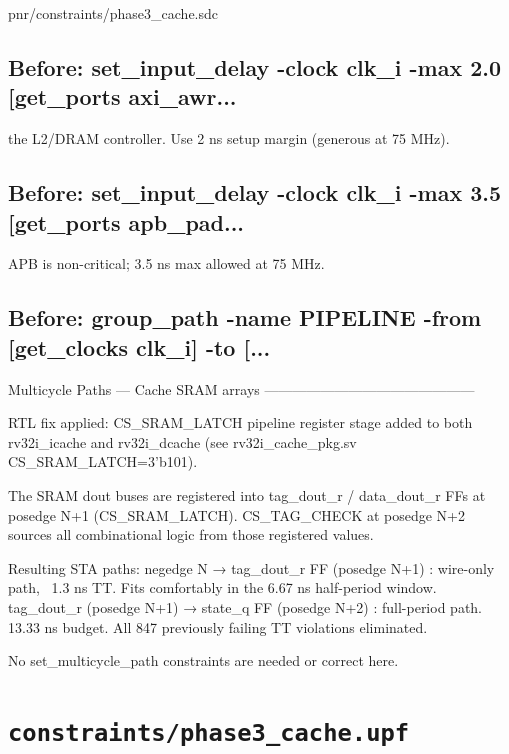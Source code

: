 \begin{relocated}{pnr/constraints/phase3_cache.sdc}
\subsection*{Before: set\_input\_delay -clock clk\_i -max 2.0 [get\_ports axi\_awr...}

\begin{textblock}
the L2/DRAM controller.  Use 2 ns setup margin (generous at 75 MHz).
\end{textblock}

\subsection*{Before: set\_input\_delay -clock clk\_i -max 3.5 [get\_ports apb\_pad...}

\begin{textblock}
APB is non-critical; 3.5 ns max allowed at 75 MHz.
\end{textblock}

\subsection*{Before: group\_path -name PIPELINE -from [get\_clocks clk\_i] -to [...}

\begin{textblock}
Multicycle Paths — Cache SRAM arrays
---------------------------------------------

RTL fix applied: CS_SRAM_LATCH pipeline register stage added to both
rv32i_icache and rv32i_dcache (see rv32i_cache_pkg.sv CS_SRAM_LATCH=3'b101).

The SRAM dout buses are registered into tag_dout_r / data_dout_r FFs at
posedge N+1 (CS_SRAM_LATCH).  CS_TAG_CHECK at posedge N+2 sources all
combinational logic from those registered values.

Resulting STA paths:
  negedge N  →  tag_dout_r FF (posedge N+1) : wire-only path, ~1.3 ns TT.
    Fits comfortably in the 6.67 ns half-period window.
  tag_dout_r (posedge N+1)  →  state_q FF (posedge N+2) : full-period path.
    13.33 ns budget.  All 847 previously failing TT violations eliminated.

No set_multicycle_path constraints are needed or correct here.
\end{textblock}

\end{relocated}

\section{\texttt{constraints/phase3\_cache.upf}}\label{tm:pd:phase3-cache-upf}

